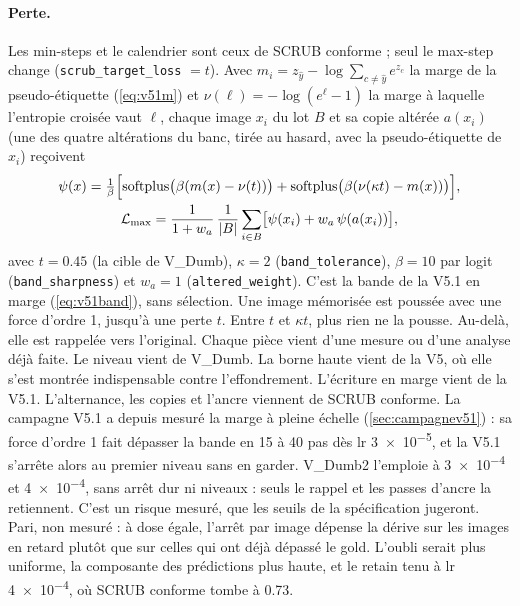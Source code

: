 \documentclass[11pt,a4paper]{article}
\newcommand{\code}[1]{\texttt{#1}}
\begin{document}
\paragraph{Perte.} Les min-steps et le calendrier sont ceux de SCRUB conforme ; seul le max-step change
(\code{scrub\_target\_loss} $=t$). Avec $m_i=z_{\hat y}-\log\sum_{c\ne\hat y}e^{z_c}$ la marge de la
pseudo-étiquette (\cref{eq:v51m}) et $\nu(\ell)=-\log(e^{\ell}-1)$ la marge à laquelle l'entropie
croisée vaut $\ell$, chaque image $x_i$ du lot $B$ et sa copie altérée $a(x_i)$ (une des quatre
altérations du banc, tirée au hasard, avec la pseudo-étiquette de $x_i$) reçoivent
\begin{gather}
  \psi(x)=\tfrac{1}{\beta}\Bigl[\operatorname{softplus}\bigl(\beta(m(x)-\nu(t))\bigr)
  +\operatorname{softplus}\bigl(\beta(\nu(\kappa t)-m(x))\bigr)\Bigr],\label{eq:vdumb2}\\
  \mathcal{L}_{\max}=\frac{1}{1+w_a}\,\frac{1}{|B|}\sum_{i\in B}\bigl[\psi(x_i)+w_a\,\psi(a(x_i))\bigr],
  \notag
\end{gather}
avec $t=\num{0.45}$ (la cible de V\_Dumb), $\kappa=2$ (\code{band\_tolerance}), $\beta=10$ par logit
(\code{band\_sharpness}) et $w_a=1$ (\code{altered\_weight}). C'est la bande de la V5.1 en marge
(\cref{eq:v51band}), sans sélection. Une image mémorisée est poussée avec une force d'ordre 1, jusqu'à
une perte $t$. Entre $t$ et $\kappa t$, plus rien ne la pousse. Au-delà, elle est rappelée vers
l'original. Chaque pièce vient d'une mesure ou d'une analyse déjà faite. Le niveau vient de V\_Dumb.
La borne haute vient de la V5, où elle s'est montrée indispensable contre l'effondrement. L'écriture
en marge vient de la V5.1. L'alternance, les copies et l'ancre viennent de SCRUB conforme. La campagne
V5.1 a depuis mesuré la marge à pleine échelle (\cref{sec:campagnev51}) : sa force d'ordre 1 fait
dépasser la bande en 15 à 40 pas dès lr \num{3e-5}, et la V5.1 s'arrête alors au premier niveau sans en
garder. V\_Dumb2 l'emploie à \num{3e-4} et \num{4e-4}, sans arrêt dur ni niveaux : seuls le rappel et les
passes d'ancre la retiennent. C'est un risque mesuré, que les seuils de la spécification jugeront. Pari, non mesuré : à dose égale, l'arrêt par image dépense la dérive sur les images en retard
plutôt que sur celles qui ont déjà dépassé le gold. L'oubli serait plus uniforme, la composante des
prédictions plus haute, et le retain tenu à lr \num{4e-4}, où SCRUB conforme tombe à \num{0.73}.
\end{document}
